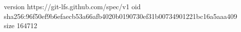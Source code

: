 version https://git-lfs.github.com/spec/v1
oid sha256:96f50ef9b6efaecb53a66afb4020b0190730ef31b00734901221bc16a5aaa409
size 164712
